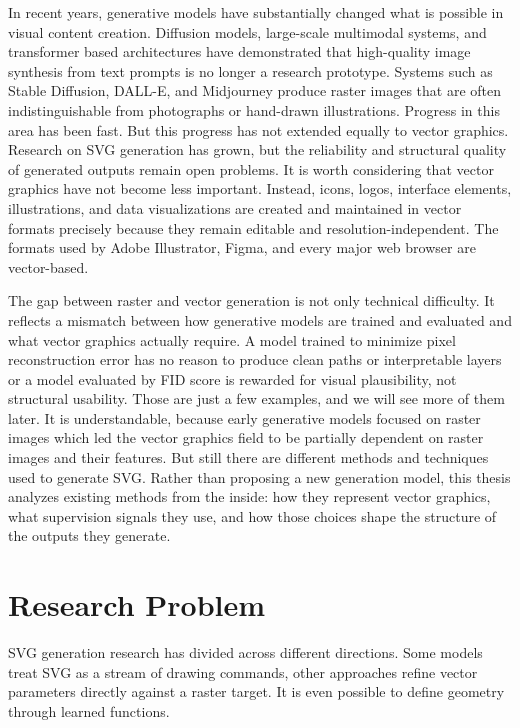 In recent years, generative models have substantially changed what 
is possible in visual content creation. Diffusion models, large-scale 
multimodal systems, and transformer based architectures have demonstrated 
that high-quality image synthesis from text prompts is no longer 
a research prototype. Systems such as Stable Diffusion, DALL-E, and 
Midjourney produce raster images that are often indistinguishable from 
photographs or hand-drawn illustrations. Progress in this area has been 
fast. But this progress has not extended equally to vector graphics. 
Research on SVG generation has grown, but the reliability and structural 
quality of generated outputs remain open problems. It is worth considering that 
vector graphics have not become less important. Instead, icons, logos, 
interface elements, illustrations, and data visualizations are created 
and maintained in vector formats precisely because they remain editable 
and resolution-independent. The formats used by Adobe Illustrator, 
Figma, and every major web browser are vector-based.



The gap between raster and vector generation is not only technical 
difficulty. It reflects a mismatch between how 
generative models are trained and evaluated and what vector graphics 
actually require. A model trained to minimize pixel reconstruction error 
has no reason to produce clean paths or interpretable layers or a model 
evaluated by FID score is rewarded for visual plausibility, not 
structural usability. Those are just a few examples, and we will see 
more of them later. It is understandable, because early generative 
models focused on raster images which led the vector graphics 
field to be partially dependent on raster images and their features. 
But still there are different methods and techniques used to generate 
SVG. Rather than proposing a new 
generation model, this thesis analyzes existing methods from the inside: 
how they represent vector graphics, what supervision signals they use, 
and how those choices shape the structure of the outputs they generate.

\section{Research Problem}

SVG generation research has divided across different directions. 
Some models treat SVG as a stream of drawing commands, other approaches
refine vector parameters directly against a raster target.
It is even possible to define geometry through learned functions. 

